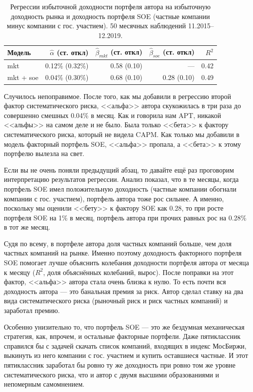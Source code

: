 \begin{table}[h]
\centering
\begin{tabular}{l|r|r|r|r}
Модель &
$\hat{\alpha}$ (ст. откл) &
$\hat{\beta}_{mkt}$ (ст. откл) &
$\hat{\beta}_{soe}$ (ст. откл) &
$R^2$ \\ \hline
mkt       & 0.12\% (0.32\%) & 0.58 (0.10) & ---         & 0.42 \\
mkt + soe & 0.04\% (0.30\%) & 0.68 (0.10) & 0.28 (0.10) & 0.49
\end{tabular}
\caption{Регрессии избыточной доходности портфеля автора на избыточную доходность рынка и доходность портфеля SOE (частные компании минус компании с гос. участием). 50 месячных наблюдений 11.2015--12.2019.}
\label{two_factor_regression_results}
\end{table}

Случилось непоправимое. После того, как мы добавили в регрессию второй фактор систематического риска, <<альфа>> автора скукожилась в три раза до совершенно смешных 0.04\% в месяц. Как и говорила нам APT, никакой <<альфы>> на самом деле и не было. Была только <<бета>> к фактору систематического риска, который не видела CAPM. Как только мы добавили в модель факторный портфель SOE, <<альфа>> пропала, а <<бета>> к этому портфелю вылезла на свет.

Если вы не очень поняли предыдущий абзац, то давайте ещё раз проговорим интерпретацию результатов регрессии. Анализ показал, что в те месяцы, когда портфель SOE имел положительную доходность (частные компании обогнали компании с гос. участием), портфель автора тоже рос сильнее. А именно, поскольку мы оценили <<бету>> к фактору SOE как 0.28, то при росте портфеля SOE на 1\% в месяц, портфель автора при прочих равных рос на 0.28\% в тот же месяц.

Судя по всему, в портфеле автора доля частных компаний больше, чем доля частных компаний на рынке. Именно поэтому доходность факторного портфеля SOE помогает лучше объяснить колебания доходности портфеля автора от месяца к месяцу ($R^2$, доля объяснённых колебаний, вырос). После поправки на этот фактор, <<альфа>> автора стала очень близка к нулю. То есть почти вся доходность автора --- это банальная премия за риск. Автор сделал ставку на два вида систематического риска (рыночный риск и риск частных компаний) и заработал премию.

Особенно унизительно то, что портфель SOE --- это же бездумная механическая стратегия, как, впрочем, и остальные факторные портфели. Даже пятиклассник справился бы с задачей скачать список компаний, входящих в индекс МосБиржи, выкинуть из него компании с гос. участием и купить оставшиеся частные. И этот пятиклассник заработал бы ровно ту же доходность при ровно том же уровне систематического риска, что и автор с двумя высшими образованиями и непомерным самомнением.

